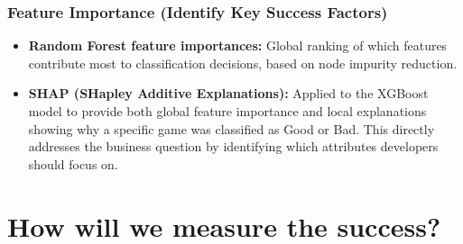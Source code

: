 \documentclass[11pt, a4paper]{article}
\begin{document}
\subsubsection{Feature Importance (Identify Key Success Factors)}

\begin{itemize}
  \item \textbf{Random Forest feature importances:} Global ranking of which features
        contribute most to classification decisions, based on node impurity reduction.
  \item \textbf{SHAP (SHapley Additive Explanations):} Applied to the XGBoost model
        to provide both global feature importance and local explanations showing why
        a specific game was classified as Good or Bad. This directly addresses the
        business question by identifying which attributes developers should focus on.
\end{itemize}

\section{How will we measure the success?}
\end{document}
